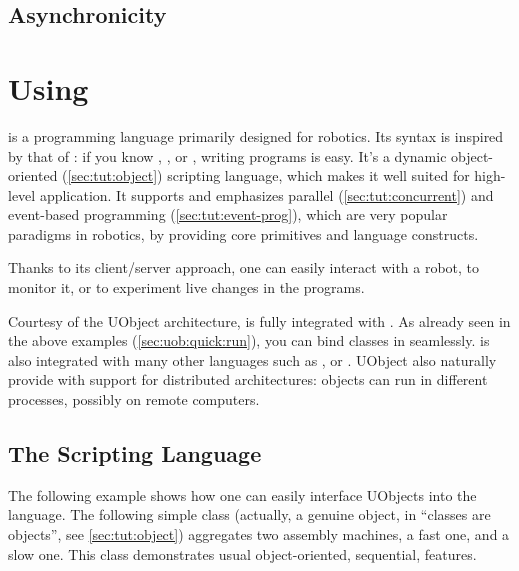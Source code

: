 \subsection{Asynchronicity}


\section{Using \us}


\us is a programming language primarily designed for robotics.  Its
syntax is inspired by that of \Cxx: if you know \C, \Cxx, \java or \Cs,
writing \us programs is easy.  It's a dynamic object-oriented
(\autoref{sec:tut:object}) scripting language, which makes it well
suited for high-level application.  It supports and emphasizes
parallel (\autoref{sec:tut:concurrent}) and event-based programming
(\autoref{sec:tut:event-prog}), which are very popular paradigms in
robotics, by providing core primitives and language constructs.

Thanks to its client/server approach, one can easily interact with a
robot, to monitor it, or to experiment live changes in the \us
programs.

Courtesy of the UObject architecture, \us is fully integrated with
\Cxx. As already seen in the above examples
(\autoref{sec:uob:quick:run}), you can bind \Cxx classes in \us
seamlessly. \us is also integrated with many other languages such as
\java, \matlab or \python.  UObject also naturally provide \us with
support for distributed architectures: objects can run in different
processes, possibly on remote computers.

\subsection{The \us Scripting Language}

The following example shows how one can easily interface UObjects into
the \us language.  The following simple class (actually, a genuine
object, in \us ``classes are objects'', see \autoref{sec:tut:object})
aggregates two assembly machines, a fast one, and a slow one.  This
class demonstrates usual object-oriented, sequential, features.

